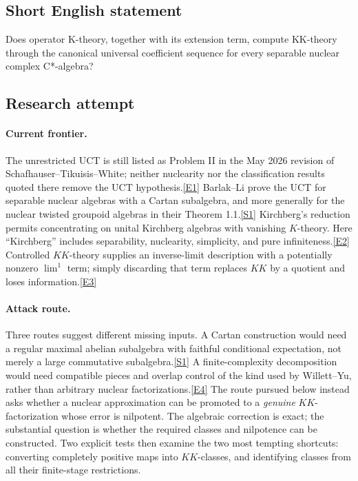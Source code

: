 \documentclass[11pt,a4paper]{article}
\newcommand{\sref}[2]{\hyperlink{source:#1:#2}{[S#2]}}
\newcommand{\eref}[2]{\hyperlink{extra:#1:#2}{[E#2]}}
\begin{document}
\subsection{Short English statement}
Does operator K-theory, together with its extension term, compute KK-theory through the canonical universal coefficient sequence for every separable nuclear complex C*-algebra?
\subsection{Research attempt}

\paragraph{Current frontier.}
The unrestricted UCT is still listed as Problem II in the May 2026 revision
of Schafhauser--Tikuisis--White; neither nuclearity nor the classification
results quoted there remove the UCT hypothesis.\eref{30006980}{1}
Barlak--Li prove the UCT for separable nuclear algebras with a Cartan
subalgebra, and more generally for the nuclear twisted groupoid algebras
in their Theorem 1.1.\sref{30006980}{1}
Kirchberg's reduction permits concentrating on unital Kirchberg algebras
with vanishing $K$-theory. Here ``Kirchberg'' includes separability,
nuclearity, simplicity, and pure infiniteness.\eref{30006980}{2}
Controlled $KK$-theory supplies an inverse-limit description with a
potentially nonzero $\lim^1$ term; simply discarding that term replaces
$KK$ by a quotient and loses information.\eref{30006980}{3}

\paragraph{Attack route.}
Three routes suggest different missing inputs. A Cartan construction would
need a regular maximal abelian subalgebra with faithful conditional
expectation, not merely a large commutative subalgebra.\sref{30006980}{1}
A finite-complexity decomposition would need compatible pieces and overlap
control of the kind used by Willett--Yu, rather than arbitrary nuclear
factorizations.\eref{30006980}{4}
The route pursued below instead asks whether a nuclear approximation can
be promoted to a \emph{genuine} $KK$-factorization whose error is nilpotent.
The algebraic correction is exact; the substantial question is whether the
required classes and nilpotence can be constructed. Two explicit tests
then examine the two most tempting shortcuts: converting completely
positive maps into $KK$-classes, and identifying classes from all their
finite-stage restrictions.
\end{document}
